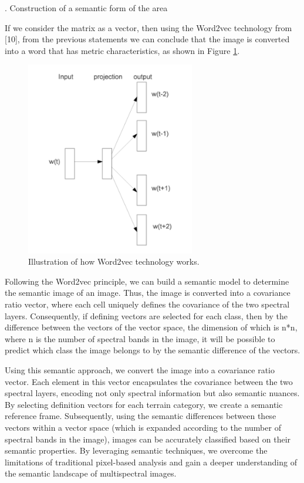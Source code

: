 \documentclass{article}
\begin{document}
\begin{multicols*}{2}
\begin{center}
    \uppercase\expandafter{}. Construction of a semantic form of the area 
\end{center}

\par If we consider the matrix as a vector, then using
the Word2vec technology from [10], from the previous
statements we can conclude that the image is converted
into a word that has metric characteristics, as shown in
Figure \ref{figure5}. 

\begin{figure}[H]
    \centering
    \includegraphics[width=\linewidth, height = 85mm]{img5}
    \caption{\small \centering Illustration of how Word2vec 
    technology works. \label{figure5}}
\end{figure}

\par Following the Word2vec principle, we can build a
semantic model to determine the semantic image of an
image. Thus, the image is converted into a covariance
ratio vector, where each cell uniquely defines the covariance of the two spectral layers. Consequently, if defining
vectors are selected for each class, then by the difference
between the vectors of the vector space, the dimension
of which is n*n, where n is the number of spectral bands
in the image, it will be possible to predict which class
the image belongs to by the semantic difference of the
vectors. 
\par Using this semantic approach, we convert the image
into a covariance ratio vector. Each element in this vector
encapsulates the covariance between the two spectral
layers, encoding not only spectral information but also
semantic nuances. By selecting definition vectors for each
terrain category, we create a semantic reference frame.
Subsequently, using the semantic differences between
these vectors within a vector space (which is expanded
according to the number of spectral bands in the image), 
images can be accurately classified based on their
semantic properties. By leveraging semantic techniques,
we overcome the limitations of traditional pixel-based
analysis and gain a deeper understanding of the semantic
landscape of multispectral images. 


\end{multicols*}
\end{document}
